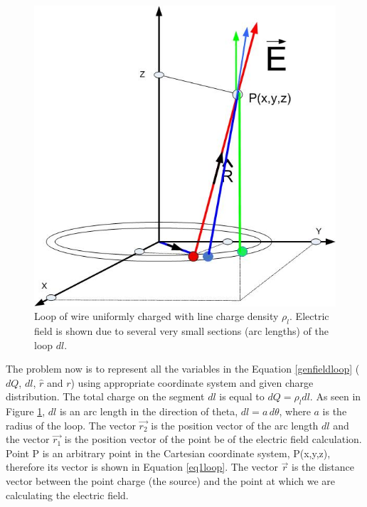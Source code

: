 \documentclass{ximera}
\begin{document}
\begin{figure}[h!]
\begin{center}
\includegraphics[scale=0.5]{../jpg/ringefieldanywheremorecharges.jpg}
\caption{\label{fig:loopAllPts} Loop of wire uniformly charged with line charge density $\rho_l$. Electric field is shown due to several very small sections (arc lengths) of the loop $dl$.}
\end{center}
\end{figure}

The problem now  is to represent all the variables in the Equation \ref{genfieldloop}  ( $dQ$, $dl$, $\hat{r}$ and $r$) using  appropriate coordinate system and given charge distribution.
The  total charge on the segment $dl$ is equal to $dQ=\rho_l dl$. As seen in Figure \ref{fig:loopAllPts}, $dl$ is an arc length in the direction of theta, $dl=a\, d\theta$, where $ a$ is the radius of the loop. The vector $\vec{r_2}$ is the position vector of the arc length $dl$ and the vector $\vec{r_1}$  is the position vector of the point be  of the electric field calculation. Point P is an arbitrary point in the Cartesian coordinate system, P(x,y,z), therefore its  vector is shown in Equation \ref{eq1loop}.  The vector $\vec{r}$ is the distance vector between the point charge (the source) and the point at which we are calculating the electric field. 
\end{document}
